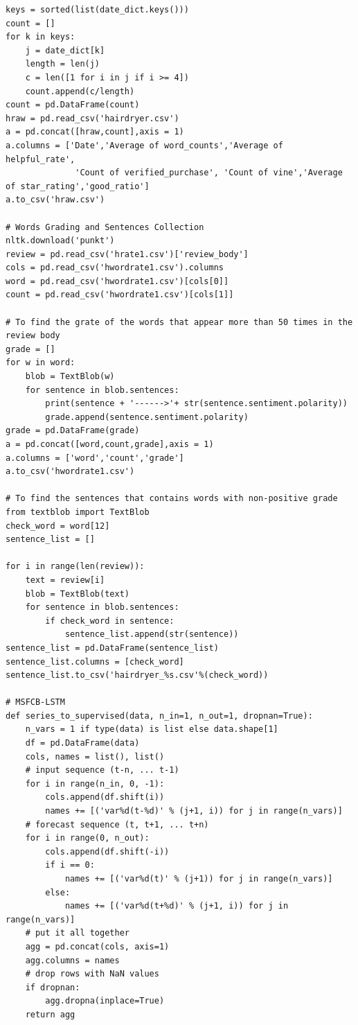 \documentclass[12pt]{article}
\begin{document}
\begin{appendices}
\begin{lstlisting}
keys = sorted(list(date_dict.keys()))
count = []
for k in keys:
    j = date_dict[k]
    length = len(j)
    c = len([1 for i in j if i >= 4])
    count.append(c/length)
count = pd.DataFrame(count)
hraw = pd.read_csv('hairdryer.csv')
a = pd.concat([hraw,count],axis = 1)
a.columns = ['Date','Average of word_counts','Average of helpful_rate',
              'Count of verified_purchase', 'Count of vine','Average of star_rating','good_ratio']
a.to_csv('hraw.csv')

# Words Grading and Sentences Collection
nltk.download('punkt')
review = pd.read_csv('hrate1.csv')['review_body']
cols = pd.read_csv('hwordrate1.csv').columns
word = pd.read_csv('hwordrate1.csv')[cols[0]]
count = pd.read_csv('hwordrate1.csv')[cols[1]]

# To find the grate of the words that appear more than 50 times in the review body
grade = []
for w in word:
    blob = TextBlob(w)
    for sentence in blob.sentences:
        print(sentence + '------>'+ str(sentence.sentiment.polarity))
        grade.append(sentence.sentiment.polarity)
grade = pd.DataFrame(grade)
a = pd.concat([word,count,grade],axis = 1)
a.columns = ['word','count','grade']
a.to_csv('hwordrate1.csv')

# To find the sentences that contains words with non-positive grade
from textblob import TextBlob
check_word = word[12]
sentence_list = []

for i in range(len(review)):
    text = review[i]
    blob = TextBlob(text)
    for sentence in blob.sentences:
        if check_word in sentence:
            sentence_list.append(str(sentence))
sentence_list = pd.DataFrame(sentence_list)
sentence_list.columns = [check_word]
sentence_list.to_csv('hairdryer_%s.csv'%(check_word))

# MSFCB-LSTM
def series_to_supervised(data, n_in=1, n_out=1, dropnan=True):
    n_vars = 1 if type(data) is list else data.shape[1]
    df = pd.DataFrame(data)
    cols, names = list(), list()
    # input sequence (t-n, ... t-1)
    for i in range(n_in, 0, -1):
        cols.append(df.shift(i))
        names += [('var%d(t-%d)' % (j+1, i)) for j in range(n_vars)]
    # forecast sequence (t, t+1, ... t+n)
    for i in range(0, n_out):
        cols.append(df.shift(-i))
        if i == 0:
            names += [('var%d(t)' % (j+1)) for j in range(n_vars)]
        else:
            names += [('var%d(t+%d)' % (j+1, i)) for j in range(n_vars)]
    # put it all together
    agg = pd.concat(cols, axis=1)
    agg.columns = names
    # drop rows with NaN values
    if dropnan:
        agg.dropna(inplace=True)
    return agg


\end{lstlisting}
\end{appendices}
\end{document}

